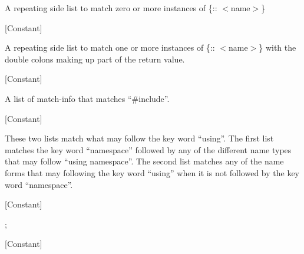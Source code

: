 \begin{doc-string}
A repeating side list to match zero or more instances of \{:: $<$name$>$\}
\end{doc-string}

\vspace{1em}
\noindent
{}
\usebox{\funcname}
 \hfill [Constant]

\begin{doc-string}
A repeating side list to match one or more instances of \{:: $<$name$>$\} with the
double colons making up part of the return value.
\end{doc-string}

\vspace{1em}
\noindent
{}
\usebox{\funcname}
 \hfill [Constant]

\begin{doc-string}
A list of match-info that matches ``\#include''.
\end{doc-string}

\vspace{1em}
\noindent
{}
\usebox{\funcname}
 \hfill [Constant]

\begin{doc-string}
These two lists match what may follow the key word ``using''.  The first list
matches the key word ``namespace'' followed by any of the different name types
that may follow ``using namespace''.  The second list matches any of the name
forms that may following the key word ``using'' when it is not followed by the
key word ``namespace''.
\end{doc-string}

\vspace{1em}
\noindent
{}
\usebox{\funcname}
 \hfill [Constant]

\begin{doc-string}
;
\end{doc-string}

\vspace{1em}
\noindent
{}
\usebox{\funcname}
 \hfill [Constant]

